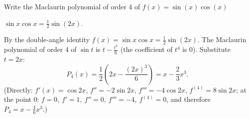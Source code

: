 
\begin{question}
Write the Maclaurin polynomial of order 4 of $f(x)=\sin(x)\cos(x)$
\end{question}

\begin{hint}
$\sin x\cos x=\frac12\sin(2x)$.
\end{hint}

\begin{solution}
By the double-angle identity $f(x)=\sin x\cos x=\frac12\sin(2x)$. The Maclaurin polynomial of order 4 of $\sin t$ is $t-\frac{t^3}{6}$ (the coefficient of $t^4$ is $0$). Substitute $t=2x$:
\[ P_4(x)=\frac12\left(2x-\frac{(2x)^3}{6}\right)=\boxed{x-\frac{2}{3}x^3}. \]
(Directly: $f'(x)=\cos2x$, $f''=-2\sin2x$, $f'''=-4\cos2x$, $f^{(4)}=8\sin2x$; at the point $0$: $f=0,\ f'=1,\ f''=0,\ f'''=-4,\ f^{(4)}=0$, and therefore $P_4=x-\frac{4}{6}x^3$.)
\end{solution}
